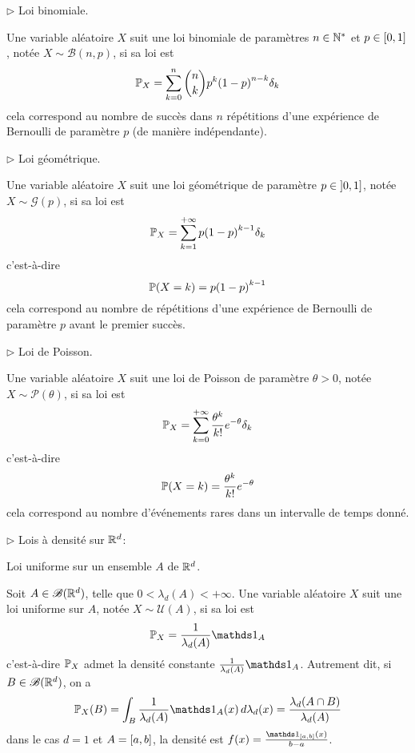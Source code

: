 \(\triangleright\) Loi binomiale.

Une variable aléatoire \(X\) suit une loi binomiale de paramètres \(n\in\mathbb{N}^\ast\) et \(p\in\mathopen{}\left[0,1\right]\mathclose{}\), notée \(X\sim\mathcal B(n,p)\), si sa loi est
\begin{equation*}
    \mathbb{P}_X = \sum_{k=0}^n\binom{n}{k}p^k{(1-p)}^{n-k}\delta_k
\end{equation*}
cela correspond au nombre de succès dans \(n\) répétitions d'une expérience de Bernoulli de paramètre \(p\) (de manière indépendante).


\(\triangleright\) Loi géométrique.

Une variable aléatoire \(X\) suit une loi géométrique de paramètre \(p\in\mathopen{}\left]0,1\right]\mathclose{}\), notée \(X\sim\mathcal G(p)\), si sa loi est
\begin{equation*}
    \mathbb{P}_X = \sum_{k=1}^{+\infty}p{(1-p)}^{k-1}\delta_k
\end{equation*}
c'est-à-dire
\begin{equation*}
    \mathbb{P}(X=k) = p{(1-p)}^{k-1}
\end{equation*}
cela correspond au nombre de répétitions d'une expérience de Bernoulli de paramètre \(p\) avant le premier succès.


\(\triangleright\) Loi de Poisson.

Une variable aléatoire \(X\) suit une loi de Poisson de paramètre \(\theta>0\), notée \(X\sim\mathcal P(\theta)\), si sa loi est
\begin{equation*}
    \mathbb{P}_X = \sum_{k=0}^{+\infty}\frac{\theta^k}{k!}e^{-\theta}\delta_k
\end{equation*}
c'est-à-dire
\begin{equation*}
    \mathbb{P}(X=k) = \frac{\theta^k}{k!}e^{-\theta}
\end{equation*}
cela correspond au nombre d'événements rares dans un intervalle de temps donné.


\(\triangleright\) Lois à densité sur \(\mathbb{R}^d\):


Loi uniforme sur un ensemble \(A\) de \(\mathbb{R}^d\).

Soit \(A\in\mathscr{B}(\mathbb{R}^d)\), telle que \(0<\lambda_d(A)<+\infty\). 
Une variable aléatoire \(X\) suit une loi uniforme sur \(A\), notée \(X\sim\mathcal U(A)\), si sa loi est
\begin{equation*}
    \bb P_X = \frac{1}{\lambda_d(A)}\one_A
\end{equation*}
c'est-à-dire \(\mathbb{P}_X\) admet la densité constante \(\frac{1}{\lambda_d(A)}\one_A\). Autrement dit,
si \(B\in\mathscr{B}(\mathbb{R}^d)\), on a
\begin{equation*}
    \bb P_X(B) = \int_B \frac{1}{\lambda_d(A)}\one_A(x)\der\lambda_d(x) = \frac{\lambda_d(A\cap B)}{\lambda_d(A)}
\end{equation*}
dans le cas \(d=1\) et \(A = \mathopen{}\left[a,b\right]\mathclose{}\), la densité est \(f(x) = \frac{\one_{\ff{a,b}}(x)}{b-a}\).


